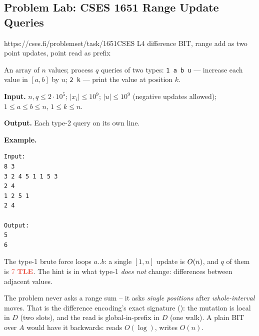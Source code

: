 \subsection{Problem Lab: CSES 1651 Range Update Queries}

  {https://cses.fi/problemset/task/1651}{CSES L4}
  {difference BIT, range add as two point updates, point read as prefix}

\begin{problemstatement}
An array of \(n\) values; process \(q\) queries of two types:
\texttt{1 a b u} --- increase each value in \([a,b]\) by \(u\);
\texttt{2 k} --- print the value at position \(k\).

\textbf{Input.} \(n,q\le 2\cdot10^5\); \(|x_i|\le10^9\); \(|u|\le10^9\)
(negative updates allowed); \(1\le a\le b\le n\), \(1\le k\le n\).

\textbf{Output.} Each type-2 query on its own line.

\textbf{Example.}
\begin{verbatim}
Input:
8 3
3 2 4 5 1 1 5 3
2 4
1 2 5 1
2 4

Output:
5
6
\end{verbatim}
\end{problemstatement}

\begin{attemptgate}
The type-1 brute force loops \(a..b\): a single \([1,n]\) update is
\(O(n)\), and \(q\) of them is \(\tle\).  The hint is in what type-1
\emph{does not} change: differences between adjacent values.
\end{attemptgate}

The problem never asks a range sum -- it asks \emph{single positions} after
\emph{whole-interval} moves.  That is the difference encoding's exact
signature (): the mutation is local in \(D\) (two slots),
and the read is global-in-prefix in \(D\) (one walk).  A plain BIT over
\(A\) would have it backwards: reads \(O(\log)\), writes \(O(n)\).

